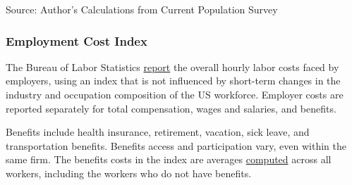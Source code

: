 \documentclass{report}
\makeatletter
\newcommand{\tbllink}[1]{\href{https://raw.githubusercontent.com/bdecon/US-chartbook/master/chartbook/data/#1}{\faTable}}
\newcommand*\short[1]{\expandafter\@gobbletwo\number\numexpr#1\relax}
\newcommand{\absnode}[3]{\node[below right, align=left] at (axis cs: #1,#2) {#3};}
\newcommand{\dateaxisticks}{
		date coordinates in=x, axis line style={draw=none},
		xmax={2022-10-31},
		max space between ticks=40,	    
		xtick={{1990-01-01}, {1992-01-01}, {1994-01-01}, 
			{1996-01-01}, {1998-01-01}, {2000-01-01}, 
			{2002-01-01}, {2004-01-01}, {2006-01-01},
			{2008-01-01}, {2010-01-01}, {2012-01-01}, {2014-01-01},
		    {2016-01-01}, {2018-01-01}, {2020-01-01}, {2022-01-01}, 
		    {2024-01-01}, {2026-01-01}},
		minor xtick={{1989-01-01}, {1991-01-01}, {1993-01-01},
			{1995-01-01}, {1997-01-01}, {1999-01-01}, 
			{2001-01-01}, {2003-01-01}, {2005-01-01}, {2007-01-01},
		    {2009-01-01}, {2011-01-01}, {2013-01-01}, {2015-01-01},
		    {2017-01-01}, {2019-01-01}, {2021-01-01}, {2023-01-01}, 
		    {2025-01-01}, {2027-01-01}},
		enlarge y limits={0.06}, enlarge x limits={0.01},
		}
\newcommand{\thickline}[4]{\addplot[ultra thick, no markers, color=#1] 
		table [x=#2, y=#3, col sep=comma] {#4};	}
\newcommand{\rbars}{
		\fill[color=black!10] (axis cs:{1990-07-01},\pgfkeysvalueof{/pgfplots/ymin}) rectangle 
			(axis cs:{1991-03-01}, \pgfkeysvalueof{/pgfplots/ymax});
		\fill[color=black!10] (axis cs:{2007-12-01},\pgfkeysvalueof{/pgfplots/ymin}) rectangle 
			(axis cs:{2009-07-01}, \pgfkeysvalueof{/pgfplots/ymax});
		\fill[color=black!10] (axis cs:{2001-03-01},\pgfkeysvalueof{/pgfplots/ymin}) rectangle 
			(axis cs:{2001-11-01}, \pgfkeysvalueof{/pgfplots/ymax});
		\fill[color=black!10] (axis cs:{2020-02-01},\pgfkeysvalueof{/pgfplots/ymin}) rectangle 
			(axis cs:{2020-05-01}, \pgfkeysvalueof{/pgfplots/ymax});}
\makeatother
\begin{document}
{\begin{minipage}{0.76\textwidth}
\hspace{7mm} 

\footnotesize{Source: Author's Calculations from Current Population Survey} \hfill \tbllink{educ_wage.csv}
\end{minipage}
\newpage
\begin{minipage}{0.76\textwidth}
\subsubsection*{Employment Cost Index}
\small The Bureau of Labor Statistics \href{https://www.bls.gov/news.release/eci.nr0.htm}{report} the overall hourly labor costs faced by employers, using an index that is not influenced by short-term changes in the industry and occupation composition of the US workforce. Employer costs are reported separately for total compensation, wages and salaries, and benefits.

Benefits include health insurance, retirement, vacation, sick leave, and transportation benefits. Benefits access and participation vary, even within the same firm. The benefits costs in the index are averages \href{https://www.bls.gov/opub/mlr/cwc/benefit-cost-concepts-and-the-limitations-of-ecec-measurement.pdf}{computed} across all workers, including the workers who do not have benefits. 
\end{minipage}

}
\end{document}
